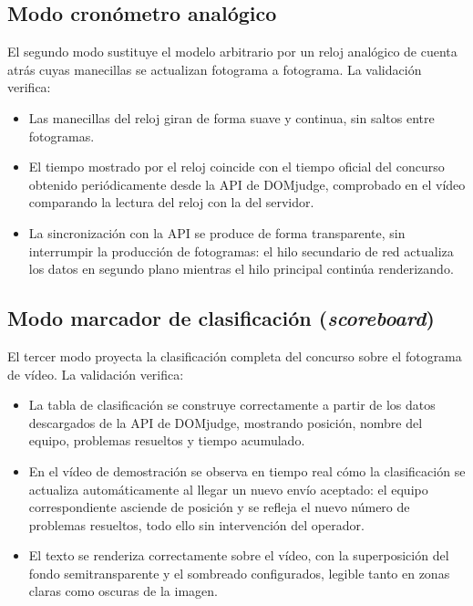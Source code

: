 \subsection{Modo cronómetro analógico}
\label{sec:val_reloj}

El segundo modo sustituye el modelo arbitrario por un reloj analógico de cuenta atrás cuyas manecillas se actualizan fotograma a fotograma. La validación verifica:

\begin{itemize}
  \item Las manecillas del reloj giran de forma suave y continua, sin saltos entre fotogramas.
  \item El tiempo mostrado por el reloj coincide con el tiempo oficial del concurso obtenido periódicamente desde la API de DOMjudge, comprobado en el vídeo comparando la lectura del reloj con la del servidor.
  \item La sincronización con la API se produce de forma transparente, sin interrumpir la producción de fotogramas: el hilo secundario de red actualiza los datos en segundo plano mientras el hilo principal continúa renderizando.
\end{itemize}

\subsection{Modo marcador de clasificación (\textit{scoreboard})}
\label{sec:val_scoreboard}

El tercer modo proyecta la clasificación completa del concurso sobre el fotograma de vídeo. La validación verifica:

\begin{itemize}
  \item La tabla de clasificación se construye correctamente a partir de los datos descargados de la API de DOMjudge, mostrando posición, nombre del equipo, problemas resueltos y tiempo acumulado.
  \item En el vídeo de demostración se observa en tiempo real cómo la clasificación se actualiza automáticamente al llegar un nuevo envío aceptado: el equipo correspondiente asciende de posición y se refleja el nuevo número de problemas resueltos, todo ello sin intervención del operador.
  \item El texto se renderiza correctamente sobre el vídeo, con la superposición del fondo semitransparente y el sombreado configurados, legible tanto en zonas claras como oscuras de la imagen.
\end{itemize}


